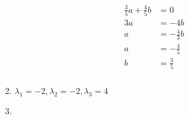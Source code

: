 \documentclass{article}
\begin{document}
\begin{align*}
  \frac{3}{5} a + \frac{4}{5} b & = 0              \\
  3 a                           & = -4 b           \\
  a                             & = -\frac{4}{3} b \\
  a                             & = -\frac{4}{5}   \\
  b                             & = \frac{3}{5}
\end{align*}

\setcounter{subsubsection}{20}
\subsubsection{}

\begin{enumerate}
  \setcounter{enumi}{1}
  \item $\lambda_1 = -2, \lambda_2 = -2, \lambda_3 = 4$

  \item


\end{enumerate}
\end{document}
